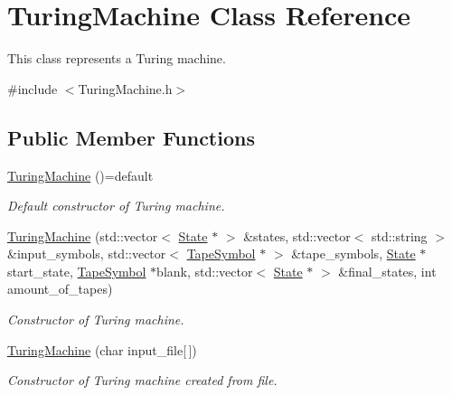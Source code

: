 \hypertarget{classTuringMachine}{}\section{Turing\+Machine Class Reference}
\label{classTuringMachine}


This class represents a Turing machine.  




{\ttfamily \#include $<$Turing\+Machine.\+h$>$}

\subsection*{Public Member Functions}
\begin{DoxyCompactItemize}
\item 
\mbox{\label{classTuringMachine_ab998b1ffcadd9e6101707346749ecd53}} 
\hyperlink{classTuringMachine_ab998b1ffcadd9e6101707346749ecd53}{Turing\+Machine} ()=default
\begin{DoxyCompactList}\small\item\em Default constructor of Turing machine. \end{DoxyCompactList}\item 
\hyperlink{classTuringMachine_abe6ad3a974d2341a75908b0ab6250410}{Turing\+Machine} (std\+::vector$<$ \hyperlink{classState}{State} $\ast$ $>$ \&states, std\+::vector$<$ std\+::string $>$ \&input\+\_\+symbols, std\+::vector$<$ \hyperlink{classTapeSymbol}{Tape\+Symbol} $\ast$ $>$ \&tape\+\_\+symbols, \hyperlink{classState}{State} $\ast$start\+\_\+state, \hyperlink{classTapeSymbol}{Tape\+Symbol} $\ast$blank, std\+::vector$<$ \hyperlink{classState}{State} $\ast$ $>$ \&final\+\_\+states, int amount\+\_\+of\+\_\+tapes)
\begin{DoxyCompactList}\small\item\em Constructor of Turing machine. \end{DoxyCompactList}\item 
\hyperlink{classTuringMachine_ad56c71b24817a917f5e4984035070cc3}{Turing\+Machine} (char input\+\_\+file\mbox{[}$\,$\mbox{]})
\begin{DoxyCompactList}\small\item\em Constructor of Turing machine created from file. \end{DoxyCompactList}\item 
\mbox{\label{classTuringMachine_a5279d180cd87e664447c6b40e0ce55e2}} 

\end{DoxyCompactItemize}
